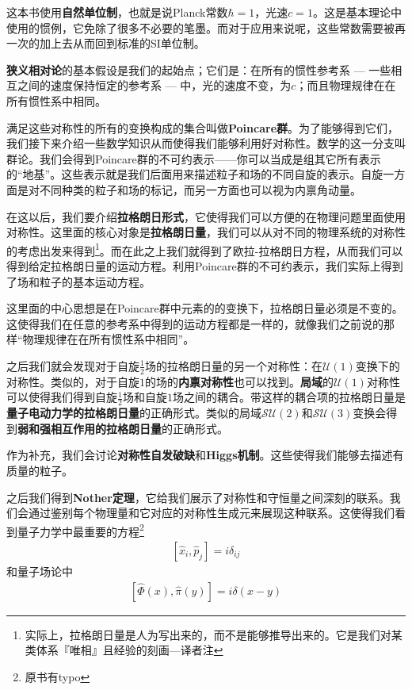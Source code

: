 这本书使用{\bf 自然单位制}，也就是说Planck常数$\hbar = 1$，光速$c=1$。这是基本理论中使用的惯例，它免除了很多不必要的笔墨。而对于应用来说呢，这些常数需要被再一次的加上去从而回到标准的SI单位制。

{\bf 狭义相对论}的基本假设是我们的起始点；它们是：在所有的惯性参考系 --- 一些相互之间的速度保持恒定的参考系 --- 中，光的速度不变，为$c$；而且物理规律在在所有惯性系中相同。

满足这些对称性的所有的变换构成的集合叫做{\bf Poincare群}。为了能够得到它们，我们接下来介绍一些数学知识从而使得我们能够利用好对称性。数学的这一分支叫群论。我们会得到Poincare群的不可约表示——你可以当成是组其它所有表示的``地基''。这些表示就是我们后面用来描述粒子和场的不同自旋的表示。自旋一方面是对不同种类的粒子和场的标记，而另一方面也可以视为内禀角动量。

在这以后，我们要介绍{\bf 拉格朗日形式}，它使得我们可以方便的在物理问题里面使用对称性。这里面的核心对象是{\bf 拉格朗日量}，我们可以从对不同的物理系统的对称性的考虑出发来得到\footnote{实际上，拉格朗日量是人为写出来的，而不是能够推导出来的。它是我们对某类体系『唯相』且经验的刻画---译者注}。而在此之上我们就得到了欧拉-拉格朗日方程，从而我们可以得到给定拉格朗日量的运动方程。利用Poincare群的不可约表示，我们实际上得到了场和粒子的基本运动方程。

这里面的中心思想是在Poincare群中元素的的变换下，拉格朗日量必须是不变的。这使得我们在任意的参考系中得到的运动方程都是一样的，就像我们之前说的那样``物理规律在在所有惯性系中相同''。

之后我们就会发现对于自旋$\tfrac{1}{2}$场的拉格朗日量的另一个对称性：在$\mathcal{U}(1)$变换下的对称性。类似的，对于自旋$1$的场的{\bf 内禀对称性}也可以找到。{\bf 局域}的$\mathcal{U}(1)$对称性可以使得我们得到自旋$\tfrac{1}{2}$场和自旋$1$场之间的耦合。带这样的耦合项的拉格朗日量是{\bf 量子电动力学的拉格朗日量}的正确形式。类似的局域$\mathcal{SU}(2)$和$\mathcal{SU}(3)$变换会得到{\bf 弱和强相互作用的拉格朗日量}的正确形式。

作为补充，我们会讨论{\bf 对称性自发破缺}和{\bf Higgs机制}。这些使得我们能够去描述有质量的粒子。

之后我们得到{\bf Nother定理}，它给我们展示了对称性和守恒量之间深刻的联系。我们会通过鉴别每个物理量和它对应的对称性生成元来展现这种联系。这使得我们看到量子力学中最重要的方程\footnote{原书有typo}
\begin{align}\label{eq1.1}
[\hat{x}_i,\hat{p}_j]=i\delta_{ij}
\end{align}
和量子场论中
\begin{align}\label{eq1.2}
[\hat{\Phi}(x),\hat{\pi}(y)]=i\delta(x-y)
\end{align}

